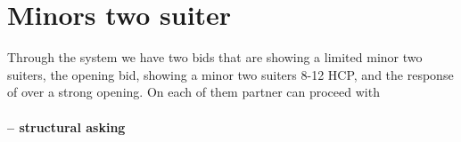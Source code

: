 \section{Minors two suiter}
Through the system we have two bids that are showing a limited minor two suiters, the \bid{2\NT} opening bid, showing a minor two suiters 8-12 HCP, and the response of \bid{2\SpS} over a strong \bid{1\CS} opening. On each of them partner can proceed with
\paragraph{\bid{3\HS} – structural asking}
